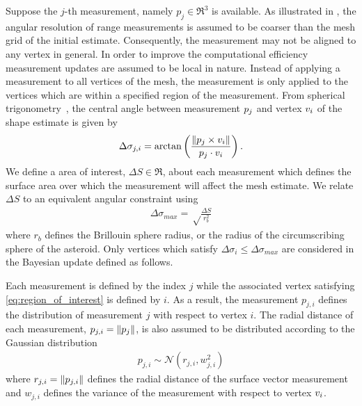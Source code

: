 \documentclass[journal]{new-aiaa}
\begin{document}
Suppose the $j$-th measurement, namely $p_j\in\Re^3$ is available. 
As illustrated in , the angular resolution of range measurements is assumed to be coarser than the mesh grid of the initial estimate. 
Consequently, the measurement may not be aligned to any vertex in general. 
In order to improve the computational efficiency measurement updates are assumed to be local in nature.
Instead of applying a measurement to all vertices of the mesh, the measurement is only applied to the vertices which are within a specified region of the measurement. 
From spherical trigonometry~\cite{gade2010}, the central angle between measurement \( p_j \) and vertex \( v_i \) of the shape estimate is given by
\begin{align}\label{eq:geodesic_distance}
    \Delta \sigma_{j,i} = \arctan \left( \frac{\left\| p_j \times v_i \right\|}{p_j \cdot v_i } \right).
\end{align}
We define a area of interest, \( \Delta S\in\Re \), about each measurement which defines the surface area over which the measurement will affect the mesh estimate.
We relate \( \Delta S \) to an equivalent angular constraint using
\begin{align}\label{eq:region_of_interest}
    \Delta \sigma_{max} = \sqrt \frac{\Delta S}{r_b^2}
\end{align}
where \( r_b \) defines the Brillouin  sphere radius, or the radius of the circumscribing sphere of the asteroid.
Only vertices which satisfy \( \Delta \sigma_i \leq \Delta \sigma_{max} \) are considered in the Bayesian update defined as follows.

Each measurement is defined by the index \( j \) while the associated vertex satisfying \cref{eq:region_of_interest} is defined by \( i \). 
As a result, the measurement \( p_{j, i} \) defines the distribution of measurement \( j \) with respect to vertex \( i \). 
The radial distance of each measurement, \( p_{j,i} = \left\| p_j \right\|\), is also assumed to be distributed according to the Gaussian distribution
\begin{align*}
    p_{j,i} \sim \mathcal{N}(r_{j,i}, w_{j,i}^2)
\end{align*}
where \( r_{j,i} = \left\| p_{j,i} \right\| \) defines the radial distance of the surface vector measurement and \( w_{j, i}\) defines the variance of the measurement with respect to vertex \( v_i\).
\end{document}
